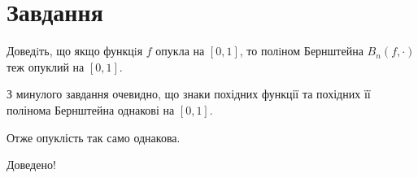 

\chapter{Завдання \theHchapter}

\begin{tcolorbox}[title=Завдання]
    Доведiть, що якщо функцiя $f$ опукла на $[0, 1]$, то полiном 
    Бернштейна $B_n(f, \cdot)$ теж опуклий на $[0, 1]$.
\end{tcolorbox}



З минулого завдання очевидно, що знаки похідних функції та похідних
її полінома Бернштейна однакові на $[0, 1]$. 


Отже опуклість так само однакова.


Доведено!